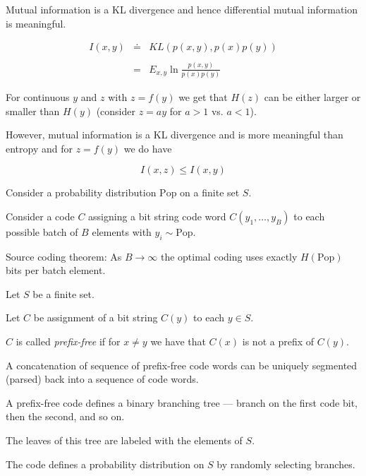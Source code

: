 {\vfill
Mutual information is a KL divergence and hence differential mutual information is meaningful.

\vfill
\begin{eqnarray*}
  I(x,y) & \doteq & KL(p(x,y),p(x)p(y)) \\
  \\
  & = & E_{x,y} \ln \frac{p(x,y)}{p(x)p(y)}
\end{eqnarray*}


For continuous $y$ and $z$ with $z = f(y)$ we get that $H(z)$ can be either larger or smaller than $H(y)$ (consider $z = ay$ for $a >1$ vs. $a<1$).

\vfill
However, mutual information is a KL divergence and is more meaningful than entropy and for $z = f(y)$ we do have

$$I(x,z) \leq I(x,y)$$



}



Consider a probability distribution $\mathrm{Pop}$ on a finite set $S$.

\vfill
Consider a code $C$ assigning a bit string code word $C(y_1,\ldots,y_B)$ to each possible batch of $B$ elements with $y_i \sim \mathrm{Pop}$.

\vfill
Source coding theorem: As $B \rightarrow \infty$ the optimal coding uses exactly $H(\mathrm{Pop})$
bits per batch element.


Let $S$ be a finite set.

\vfill
Let $C$ be assignment of a bit string $C(y)$ to each $y \in S$.

\vfill
$C$ is called {\em prefix-free} if for $x \not = y$ we have that $C(x)$ is not a prefix of $C(y)$.

\vfill
A concatenation of sequence of prefix-free code words can be uniquely segmented (parsed) back into a sequence of code words.


A prefix-free code defines a binary branching tree --- branch on the first code bit, then the second, and so on.

\vfill
The leaves of this tree are labeled with the elements of $S$.

\vfill
The code defines a probability distribution on $S$ by randomly selecting branches.

